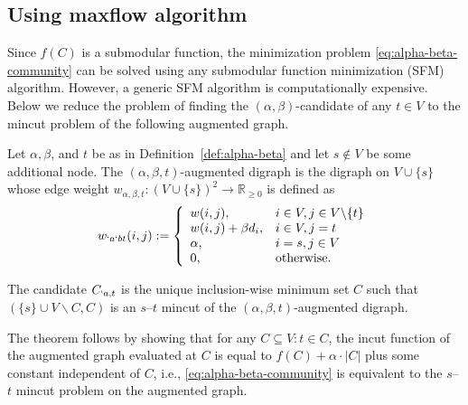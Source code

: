 
\subsection{Using maxflow algorithm}

Since $f(C)$ is a submodular function, the minimization problem \eqref{eq:alpha-beta-community} can be solved using any submodular function
minimization (SFM) algorithm. However, a generic SFM algorithm is computationally expensive. Below we reduce the problem of finding the $(\alpha,\beta)$-candidate of any $t\in V$ to the  
mincut problem of the following augmented graph.
\begin{definition}
	\label{def:augmented}
	Let $\alpha, \beta$, and $t$ be as in Definition~\ref{def:alpha-beta} and let $s \notin V$ be
	some additional node.
	The
	$(\alpha,\beta,t)$-augmented digraph is the digraph on $V \cup \{s\}$  whose edge weight $w_{\alpha,\beta,t}: (V\cup \{s\})^{2} \rightarrow
	\mathbb{R}_{\geq 0}$ is defined as
	\begin{align}
		w_{`a`b t}(i,j):= \left\{
			\begin{array}{ll}
				w(i,j), & i\in V, j\in V\backslash \{t\} \\
				w(i,j) + \beta d_{i}, & i\in V, j = t  \\
				\alpha, & i = s, j \in V \\
				0, & \text{otherwise}.
			\end{array}
			\right .
	\end{align}
\end{definition}

\begin{theorem}
  \label{thm:mc}
	The candidate $C_{`a,t}$ is the unique inclusion-wise minimum set $C$ such that $(\{s\}\cup
	V\backslash C, C)$ is an $s$--$t$ mincut of the $(\alpha,\beta,t)$-augmented digraph.
\end{theorem}

\begin{Proof}[Sketch]
  The theorem follows by showing that for any $C\subseteq V:t\in C$, the incut function of the
  augmented graph evaluated at $C$ is equal to
  $f(C) + \alpha \! \cdot \! |C|$ plus some constant independent of $C$, i.e., \eqref{eq:alpha-beta-community} is
  equivalent to the $s$--$t$ mincut
  problem on the augmented graph.
\end{Proof}

